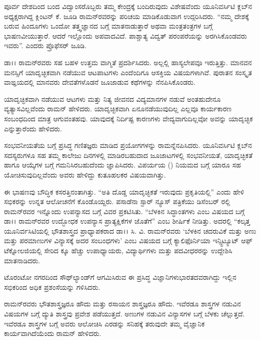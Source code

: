 \newpage

ಪೂರ್ವ ದೇಶದಿಂದ ಬಂದ ವಿದ್ವಾಂಸರೊಬ್ಬರು ತಮ್ಮ ಕೇಂದ್ರಕ್ಕೆ ಬಂದಿರುವುದು ವಿಶೇಷವೆಂದು ಯೂನಿವರ್ಸಿಟಿ ಕ್ಲಬ್‍ನ ಅಧ್ಯಕ್ಷರಾಗಿದ್ದ ಕ್ಲಿಂಟನ್ ಕೆ. ಜೂಡಿ ರಾಮನ್‍ರವರನ್ನು ಪರಿಚಯ ಮಾಡಿಕೊಡುವಾಗ ಉದ್ಗರಿಸಿದರು. “ನಮ್ಮ ದೇಶಕ್ಕೆ ಬರುವ ಹಿಂದೂಗಳು ಒಂದೋ ತತ್ತ್ವಜ್ಞಾನದ ಬಗ್ಗೆ ಮಾತನಾಡುತ್ತಾರೆ ಅಥವಾ ಮಂತ್ರ\enginline{-}ತಂತ್ರಗಳ ಬಗ್ಗೆ ಭಾಷಣವೀಯುತ್ತಾರೆ. ಆದರೆ ಇಲ್ಲೊಂದು ಅಪವಾದವಿದೆ. ಪಾಶ್ಚಾತ್ಯ ವಿದ್ವತ್ ಪರಂಪರೆಯನ್ನು ಅರಗಿಸಿಕೊಂಡವರು ಇವರು”. ಎಂದರು ಪ್ರೊಫೆಸರ್ ಜೂಡಿ.

\vskip 1pt

ಡಾ।। ರಾಮನ್‍ರವರು ಸಹ ಬಹಳ ಉತ್ತಮ ವಾಗ್ಮಿತೆ ಪ್ರದರ್ಶಿಸಿದರು. ಅಲ್ಲಲ್ಲಿ ಹಾಸ್ಯಲೇಪವೂ ಇರುತ್ತಿತ್ತು. ಮಾನವನ ಮನಸ್ಸಿಗೆ ಯಾದೃಚ್ಛಿಕವಾಗಿ ನಡೆಯುವ ಆಟ\enginline{-}ಪಾಟಗಳು ಎಂದೆಂದಿಗೂ ಆಸಕ್ತಿಯ ವಿಷಯಗಳಾಗಿವೆ. ಪುರಾತನ ಸಂಸ್ಕೃತ ವಾಙ್ಞಯದಲ್ಲಿ ಮಾನವರು ದೇವತೆಗಳೊಡನೆ ಜೂಜಾಡುವ ಕಥೆಗಳನ್ನು ನೆನಪಿಸಿಕೊಂಡರು.

\vskip 1pt

ಯಾದೃಚ್ಛಿಕವಾಗಿ ನಡೆಯುವ ಆಟಗಳು ಮತ್ತು ನಿತ್ಯ ಜೀವನದ ವಿದ್ಯಮಾನಗಳ ನಡುವೆ ಅಂತಹುದೇನೂ ವ್ಯತ್ಯಾಸವಿಲ್ಲವೆಂದು ರಾಮನ್ ಹೇಳಿದರು. ಯಾದೃಚ್ಛಿಕವಾಗಿ ಏನೂ\break ನಡೆಯುವುದಿಲ್ಲ ಎಲ್ಲವೂ ಕಾರ್ಯಕಾರಣ ಸಂಬಂಧದಿಂದ ಮಾತ್ರ ಆಗುವಂತಹವು. ಯಾವುದಕ್ಕೆ ನಿರ್ದಿಷ್ಟ ಕಾರಣಗಳು ವೇದ್ಯವಾಗುದಿಲ್ಲವೋ ಅವನ್ನು ಯಾದೃಚ್ಛಿಕ ಎನ್ನುತ್ತಾರೆಂದು ಹೇಳಿದರು.

\vskip 1pt

ಸಂಭವನೀಯತೆಯ ಬಗ್ಗೆ ಪ್ರಸಿದ್ಧ ಗಣಿತಜ್ಞರು ಮಾಡಿದ ಪ್ರಯೋಗಗಳನ್ನು ರಾಮನ್\break ನೆನಪಿಸಿದರು. ಯೂನಿವರ್ಸಿಟಿ ಕ್ಲಬ್‍ನ ಸದಸ್ಯರುಗಳೂ ಸಹ ತಮ್ಮ ಕಾಲೇಜು ದಿನಗಳಲ್ಲಿ ಮಾಡಿರಬಹುದಾದ ಜೂಜಾಟಗಳಲ್ಲಿ ಸಂಭವನೀಯತೆ, ಯಾದೃಚ್ಛಿಕತೆ ಹಾಗೂ ಆಯ್ಕೆಗಳ ಬಗ್ಗೆ ಗಮನಿಸಿರಬಹುದೆಂದು ಜ್ಞಾಪಿಸಿದರು. ವಿಪರ್ಯಯ () ನಿಯಮದ ಬಗ್ಗೆ ಯಾರೂ ಸಹ ಯೋಚಿಸುವುದಿಲ್ಲವೆಂದು ಅವರು ಹೇಳಿದ್ದು ಕುತೂಹಲಕರ ವಿಷಯವಾಗಿತ್ತು.

\vskip 1pt

ಈ ಭಾಷಣವು ಬೌದ್ಧಿಕ ಕಸರತ್ತಿನಂತಾಗಿತ್ತು. “ಅತಿ ದೊಡ್ಡ ಯಾದೃಚ್ಛಿಕತೆ ಇರುವುದು ಪ್ರಕೃತಿಯಲ್ಲಿ” ಎಂದು ಹೇಳಿ ಸಭಿಕರನ್ನು ಉನ್ನತ ಆಲೋಚನೆಗೆ ಕೊಂಡೊಯ್ದರು. ಪಸಾಡೆನಾ ಸ್ಟಾರ್ ನ್ಯೂಸ್ ಪತ್ರಿಕೆಯು  ಡಿಸೆಂಬರ್ ರಲ್ಲಿ ರಾಮನ್‍ರವರ ಇನ್ನೊಂದು ಉಪನ್ಯಾಸದ ಬಗ್ಗೆ ವಿವರ ಪ್ರಕಟಿಸಿತು. “ಬೆಳಕಿನ ಸಿದ್ಧಾಂತಗಳು ಎಂಬ ವಿಷಯದ ಬಗ್ಗೆ ಡಾ।। ರಾಮನ್‍ರವರ ಉದ್ಭೋಧಕ ಉಪನ್ಯಾಸ ಪ್ರಾತ್ಯಕ್ಷಿಕೆಗಳ ಜೊತೆಗೆ” ಎಂಬ ಶೀರ್ಷಿಕೆ ನೀಡಿತ್ತು. ಅದರಲ್ಲಿ \enginline{-} “ಕಲ್ಕತ್ತ ಯೂನಿರ್ವಸಿಟಿಯಲ್ಲಿ ಭೌತಶಾಸ್ತ್ರದ ಪ್ರಾಧ್ಯಾಪಕರಾದ ಡಾ।। ಸಿ. ವಿ. ರಾಮನ್‍ರವರು ‘ಬೆಳಕಿನ ಚದರುವಿಕೆ ಮತ್ತು ಅಣು ಮತ್ತು ಪರಮಾಣುಗಳ ವಿನ್ಯಾಸಕ್ಕೆ ಅದರ ಸಂಬಂಧಗಳು’ ಎಂಬ ವಿಷಯದ ಬಗ್ಗೆ ಕ್ಯಾಲಿಫೊರ್ನಿಯಾ ಇನ್ಸ್ಟಿಟ್ಯೂಟ್ ಆಫ್ ಟೆಕ್ನೋಲಜಿಯಲ್ಲಿ ಸೇರಿದ  ಕ್ಕೂ ಹೆಚ್ಚು ಉಪಾಧ್ಯಾಯರು, ವಿದ್ಯಾರ್ಥಿಗಳು ಮತ್ತು ಪದವೀಧರರನ್ನು ಉದ್ದೇಶಿಸಿ ಮಾತನಾಡಿದರು.

ಟೊರಂಟೋ ನಗರದಿಂದ ಸೌಥ್‍ಲ್ಯಾಂಡ್‍ಗೆ ಆಗಮಿಸಿರುವ ಈ ಪ್ರಸಿದ್ಧ ವಿಜ್ಞಾನಿಗಳು\break ಭಾರತದವರಾಗಿದ್ದು ಇಲ್ಲಿನ ಸಭಿಕರಿಂದ ಅಧಿಕ ಪ್ರಶಂಸೆಯನ್ನು ಗಳಿಸಿದರು.

ರಾಮನ್‍ರವರು ಭೌತಶಾಸ್ತ್ರಜ್ಞರೂ ಹೌದು ಮತ್ತು ರಸಾಯನ ಶಾಸ್ತ್ರಜ್ಞರೂ ಹೌದು. ಇವೆರಡೂ ಶಾಸ್ತ್ರಗಳ ನಡುವಿನ ವಿಷಯಗಳ ಬಗ್ಗೆ ದ್ಯುತಿ ಶಾಸ್ತ್ರವು ಪ್ರವೇಶ ಪಡೆಯುತ್ತದೆ. ಅಣುಗಳ ನಡುವಿನ ವಿನ್ಯಾಸಗಳ ಬಗ್ಗೆ ಬೆಳಕು ಚೆಲ್ಲುತ್ತದೆ. ಇವೆರಡೂ ಶಾಸ್ತ್ರಗಳ ಬಗ್ಗೆ ಅವರು ಆಲೋಚಿಸಿ ಎರಡನ್ನು ಸನಿಹಕ್ಕೆ ತರುವುದೇ ತಮ್ಮ ವೈಜ್ಞಾನಿಕ ಕಾರ್ಯವಾಗಿದೆಯೆಂದು ರಾಮನ್ ಹೇಳಿದರು.

